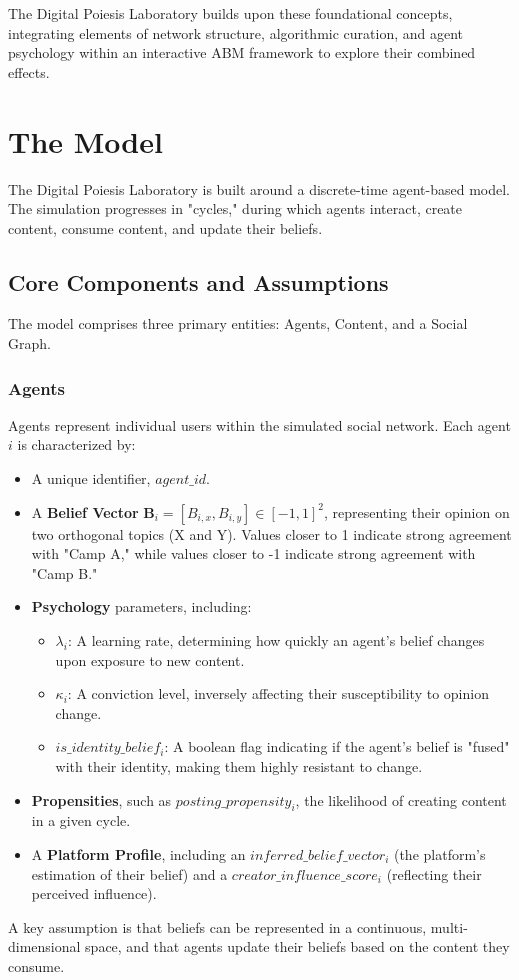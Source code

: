 \documentclass[10pt,a4paper]{article}
\newcommand{\belief}{\mathbf{B}}
\newcommand{\learningrate}{\lambda}
\newcommand{\conviction}{\kappa}
\begin{document}
The Digital Poiesis Laboratory builds upon these foundational concepts, integrating elements of network structure, algorithmic curation, and agent psychology within an interactive ABM framework to explore their combined effects.

\section{The Model}
\label{sec:model}
The Digital Poiesis Laboratory is built around a discrete-time agent-based model. The simulation progresses in "cycles," during which agents interact, create content, consume content, and update their beliefs.

\subsection{Core Components and Assumptions}
The model comprises three primary entities: Agents, Content, and a Social Graph.

\subsubsection{Agents}
Agents represent individual users within the simulated social network. Each agent $i$ is characterized by:
\begin{itemize}
    \item A unique identifier, $agent\_id$.
    \item A \textbf{Belief Vector} $\belief_i = [B_{i,x}, B_{i,y}] \in [-1, 1]^2$, representing their opinion on two orthogonal topics (X and Y). Values closer to 1 indicate strong agreement with "Camp A," while values closer to -1 indicate strong agreement with "Camp B."
    \item \textbf{Psychology} parameters, including:
    \begin{itemize}
        \item $\learningrate_i$: A learning rate, determining how quickly an agent's belief changes upon exposure to new content.
        \item $\conviction_i$: A conviction level, inversely affecting their susceptibility to opinion change.
        \item $is\_identity\_belief_i$: A boolean flag indicating if the agent's belief is "fused" with their identity, making them highly resistant to change.
    \end{itemize}
    \item \textbf{Propensities}, such as $posting\_propensity_i$, the likelihood of creating content in a given cycle.
    \item A \textbf{Platform Profile}, including an $inferred\_belief\_vector_i$ (the platform's estimation of their belief) and a $creator\_influence\_score_i$ (reflecting their perceived influence).
\end{itemize}
A key assumption is that beliefs can be represented in a continuous, multi-dimensional space, and that agents update their beliefs based on the content they consume.
\end{document}
